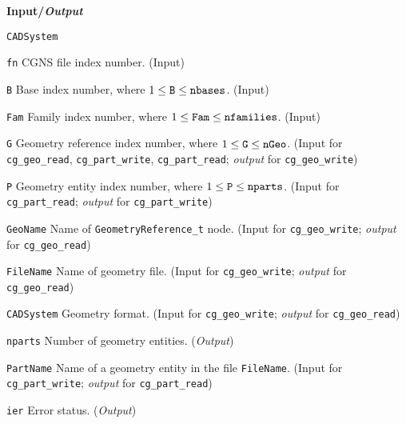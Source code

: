 \noindent
\textbf{\textcolor{input}{Input}/\textcolor{output}{\textit{Output}}}

\begin{Ventryi}{\texttt{CADSystem}}\raggedright
\item [\texttt{fn}]
      CGNS file index number.
      (\textcolor{input}{Input})
\item [\texttt{B}]
      Base index number, where $1 \leq \text{\texttt{B}} \leq \text{\texttt{nbases}}$.
      (\textcolor{input}{Input})
\item [\texttt{Fam}]
      Family index number, where $1 \leq \text{\texttt{Fam}} \leq \text{\texttt{nfamilies}}$.
      (\textcolor{input}{Input})
\item [\texttt{G}]
      Geometry reference index number, where $1 \leq \text{\texttt{G}} \leq \text{\texttt{nGeo}}$.
      (\textcolor{input}{Input} for \texttt{cg\_geo\_read},
      \texttt{cg\_part\_write}, \texttt{cg\_part\_read};
      \textcolor{output}{\textit{output}} for \texttt{cg\_geo\_write})
\item [\texttt{P}]
      Geometry entity index number, where $1 \leq \text{\texttt{P}} \leq \text{\texttt{nparts}}$.
      (\textcolor{input}{Input} for \texttt{cg\_part\_read};
      \textcolor{output}{\textit{output}} for \texttt{cg\_part\_write})
\item [\texttt{GeoName}]
      Name of \texttt{GeometryReference\_t} node.
      (\textcolor{input}{Input} for \texttt{cg\_geo\_write};
      \textcolor{output}{\textit{output}} for \texttt{cg\_geo\_read})
\item [\texttt{FileName}]
      Name of geometry file.
      (\textcolor{input}{Input} for \texttt{cg\_geo\_write};
      \textcolor{output}{\textit{output}} for \texttt{cg\_geo\_read})
\item [\texttt{CADSystem}]
      Geometry format.
      (\textcolor{input}{Input} for \texttt{cg\_geo\_write};
      \textcolor{output}{\textit{output}} for \texttt{cg\_geo\_read})
\item [\texttt{nparts}]
      Number of geometry entities.
      (\textcolor{output}{\textit{Output}})
\item [\texttt{PartName}]
      Name of a geometry entity in the file \texttt{FileName}.
      (\textcolor{input}{Input} for \texttt{cg\_part\_write};
      \textcolor{output}{\textit{output}} for \texttt{cg\_part\_read})
\item [\texttt{ier}]
      Error status.
      (\textcolor{output}{\textit{Output}})
\end{Ventryi}

